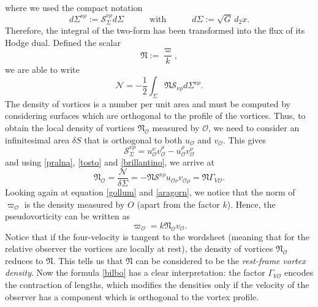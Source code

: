 \documentclass[usenatbib%
]{mnras}
\newcommand{\spc}{\quad \quad \quad}
\begin{document}
where we used the compact notation
\begin{equation}
d\Sigma^{\nu \rho} := \mathcal{S}^{\nu \rho}_{\Sigma} d\Sigma   \spc \text{with} \spc  d\Sigma:=\sqrt{G} \, d_2 x.
\end{equation}
Therefore, the integral of the two-form has been transformed into the flux of its Hodge dual. Defined the scalar
\begin{equation}\label{giochiamocela}
\mathfrak{N}:= \dfrac{\varpi}{k},
\end{equation}
we are able to write
\begin{equation}
\mathcal{N} = -\dfrac{1}{2} \int_{\Sigma} \mathfrak{N} \mathcal{S}_{\nu \rho}  d\Sigma^{\nu \rho}.
\end{equation}
The density of vortices is a number per unit area and must be computed by considering surfaces which are orthogonal to the profile of the vortices. Thus, to obtain the local density of vortices $\mathfrak{N}_{\mathcal{O}}$ measured by $\mathcal{O}$, we need to consider an infinitesimal area $\delta S$ that is orthogonal to both $u_{\mathcal{O}}$ and $v_{\mathcal{O}}$.
This gives
\begin{equation}
\mathcal{S}^{\nu \rho}_{\Sigma} = u_{\mathcal{O}}^\nu v_{\mathcal{O}}^\rho - u_{\mathcal{O}}^\rho v_{\mathcal{O}}^\nu 
\end{equation}
and using \eqref{pralna}, \eqref{tosto} and \eqref{brillantino}, we arrive at
\begin{equation}\label{zutturale}
\mathfrak{N}_{\mathcal{O}} = \dfrac{\mathcal{N}}{\delta \Sigma} = - \mathfrak{N} \mathcal{S}^{\nu \rho} u_{{\mathcal{O}}\nu} v_{{\mathcal{O}}\rho} = \mathfrak{N} \Gamma_{V{\mathcal{O}}}.
\end{equation}
Looking again at equation \eqref{gollum} and \eqref{aragorn}, we notice that the norm of $\varpi_{\mathcal{O}}$ is the density measured by $O$ (apart from the factor $k$). Hence, the pseudovorticity can be written as 
\begin{equation}
\varpi_{\mathcal{O}} = k \mathfrak{N}_{\mathcal{O}} v_{\mathcal{O}}.
\end{equation}
Notice that if the four-velocity is tangent to the wordsheet (meaning that for the relative observer the vortices are locally at rest), the density of vortices $\mathfrak{N}_{\mathcal{O}}$ reduces to $\mathfrak{N}$. This tells us that $\mathfrak{N}$ can be considered to be the \emph{rest-frame vortex density}. Now the formula \eqref{bilbo} has a clear interpretation: the factor $\Gamma_{V{\mathcal{O}}}$ encodes the contraction of lengths, which modifies the densities only if the velocity of the observer has a component which is orthogonal to the vortex profile.
\end{document}
